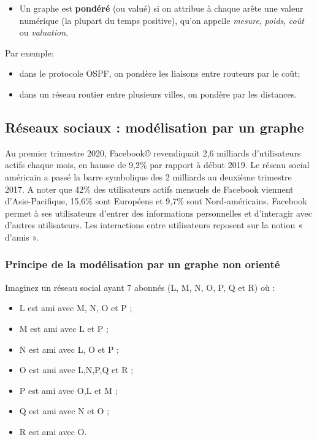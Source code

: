 \documentclass[
  letterpaper,
  DIV=11,
  numbers=noendperiod]{scrartcl}
\providecommand{\tightlist}{%
  \setlength{\itemsep}{0pt}\setlength{\parskip}{0pt}}\usepackage{longtable,booktabs,array}
\begin{document}
\begin{itemize}
\tightlist
\item
  Un graphe est \textbf{pondéré} (ou valué) si on attribue à chaque
  arête une valeur numérique (la plupart du temps positive), qu'on
  appelle \emph{mesure}, \emph{poids}, \emph{coût} ou \emph{valuation}.
\end{itemize}

Par exemple:

\begin{itemize}
\tightlist
\item
  dans le protocole OSPF, on pondère les liaisons entre routeurs par le
  coût;\\
\item
  dans un réseau routier entre plusieurs villes, on pondère par les
  distances.
\end{itemize}

\hypertarget{ruxe9seaux-sociaux-moduxe9lisation-par-un-graphe}{%
\subsection{Réseaux sociaux : modélisation par un
graphe}\label{ruxe9seaux-sociaux-moduxe9lisation-par-un-graphe}}

Au premier trimestre 2020, Facebook© revendiquait 2,6 milliards
d'utilisateurs actifs chaque mois, en hausse de 9,2\% par rapport à
début 2019. Le réseau social américain a passé la barre symbolique des 2
milliards au deuxième trimestre 2017. A noter que 42\% des utilisateurs
actifs mensuels de Facebook viennent d'Asie-Pacifique, 15,6\% sont
Européens et 9,7\% sont Nord-américains. Facebook permet à ses
utilisateurs d'entrer des informations personnelles et d'interagir avec
d'autres utilisateurs. Les interactions entre utilisateurs reposent sur
la notion « d'amis ».

\hypertarget{principe-de-la-moduxe9lisation-par-un-graphe-non-orientuxe9}{%
\subsubsection{Principe de la modélisation par un graphe non
orienté}\label{principe-de-la-moduxe9lisation-par-un-graphe-non-orientuxe9}}

Imaginez un réseau social ayant 7 abonnés (L, M, N, O, P, Q et R) où :

\begin{itemize}
\item
  L est ami avec M, N, O et P ;
\item
  M est ami avec L et P ;
\item
  N est ami avec L, O et P ;
\item
  O est ami avec L,N,P,Q et R ;
\item
  P est ami avec O,L et M ;
\item
  Q est ami avec N et O ;
\item
  R est ami avec O.
\end{itemize}
\end{document}

